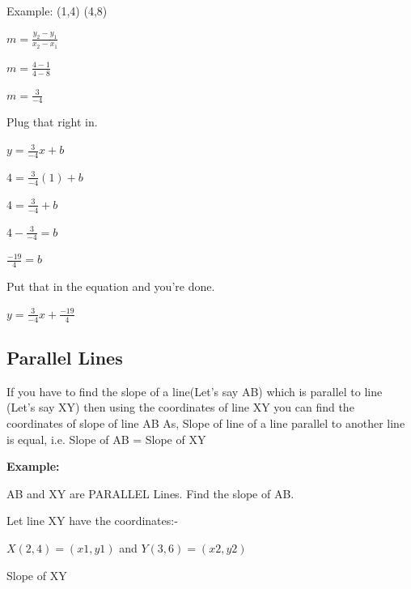 Example: (1,4) (4,8)



$m = \frac{y _2-y _1}{x _2-x _1}$



$m = \frac{4-1}{4-8}$



$m = \frac{3}{-4}$



Plug that right in.



$y = \frac{3}{-4}x+b$



$4 = \frac{3}{-4}(1)+b$



$4 = \frac{3}{-4}+b$



$4-\frac{3}{-4} = b$



$\frac{-19}{4} = b$



Put that in the equation and you're done.



$y = \frac{3}{-4}x + \frac{-19}{4}$




\subsection{Parallel Lines}
\label{sss:para-7283}




If you have to find the slope of a line(Let's say AB) which is parallel to line (Let's say
XY) then using the coordinates of line XY you can find the coordinates of slope of line AB
As, Slope of line of a line parallel to another line is equal, i.e. Slope of AB = Slope of
XY



\textbf{Example:}



AB and XY are PARALLEL Lines. Find the slope of AB.



Let line XY have the coordinates:-



$X(2,4)=(x1,y1)$ and $Y(3,6)=(x2,y2)$



Slope of XY



